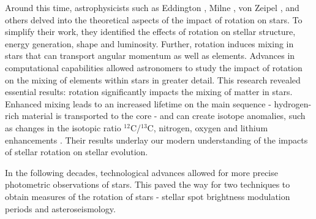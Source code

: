 Around this time, astrophysicists such as Eddington \citep{eddington_conditions_1918,eddington_internal_1926,eddington_internal_1929}, Milne \citep{milne_equilibrium_1923}, von Zeipel \citep{von_zeipel_radiative_1924}, and others delved into the theoretical aspects of the impact of rotation on stars.
To simplify their work, they identified the effects of rotation on stellar structure, energy generation, shape and luminosity. 
Further, rotation induces mixing in stars that can transport angular momentum as well as elements.
Advances in computational capabilities allowed astronomers to study the impact of rotation on the mixing of elements within stars in greater detail. 
This research revealed essential results: rotation significantly impacts the mixing of matter in stars. 
Enhanced mixing leads to an increased lifetime on the main sequence - hydrogen-rich material is transported to the core - and can create isotope anomalies, such as changes in the isotopic ratio $^{12}$C/$^{13}$C, nitrogen, oxygen and lithium enhancements \citep{maeder_evolution_2000,heger_presupernova_2000,charbonnel_lithium_1994}.
Their results underlay our modern understanding of the impacts of stellar rotation on stellar evolution.

In the following decades, technological advances allowed for more precise photometric observations of stars. This paved the way for two techniques to obtain measures of the rotation of stars - stellar spot brightness modulation periods and asteroseismology.

